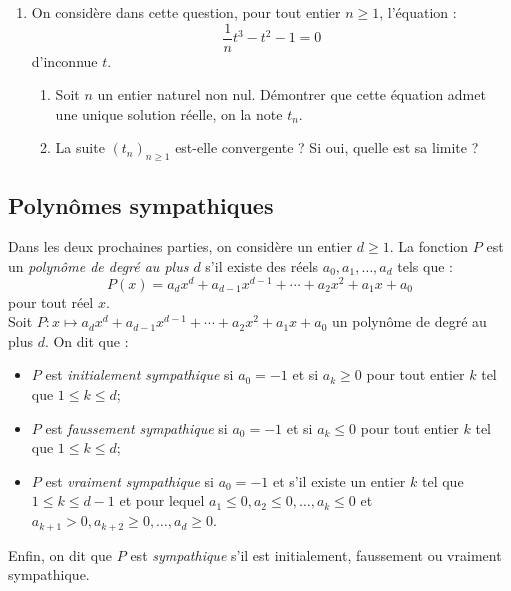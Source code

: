 \documentclass[landscape,twocolumn,leqno,a4paper,10pt]{report} %
\renewcommand{\geq}{\geqslant}
\begin{document}
\begin{enumerate}
\begin{enumerate}
	\end{enumerate}
	\item On considère dans cette question, pour tout entier $n \geq 1$, l'équation :
	$$\frac{1}{n} t^{3}-t^{2}-1=0$$
	d'inconnue $t$.
	\begin{enumerate}
		\item Soit $n$ un entier naturel non nul. Démontrer que cette équation admet une unique solution réelle, on la note $t_{n}$.
		\item La suite $\left(t_{n}\right)_{n \geq 1}$ est-elle convergente ? Si oui, quelle est sa limite ?
	\end{enumerate}
\end{enumerate}


\subsection{Polynômes sympathiques}


Dans les deux prochaines parties, on considère un entier $d \geq 1$. La fonction $P$ est un \textit{polynôme de degré au plus $d$} s'il existe des réels $a_{0}, a_{1}, \ldots, a_{d}$ tels que :
$$P(x)=a_{d} x^{d}+a_{d-1} x^{d-1}+\cdots+a_{2} x^{2}+a_{1} x+a_{0}$$
pour tout réel $x$.\\
Soit $P: x \mapsto a_{d} x^{d}+a_{d-1} x^{d-1}+\cdots+a_{2} x^{2}+a_{1} x+a_{0}$ un polynôme de degré au plus $d$. On dit que :

\begin{itemize}
	\item[$\triangleright$] $P$ est \textit{initialement sympathique} si $a_{0}=-1$ et si $a_{k} \geq 0$ pour tout entier $k$ tel que $1 \leqslant k \leqslant d$;
	\item[$\triangleright$] $P$ est \textit{faussement sympathique} si $a_{0}=-1$ et si $a_{k} \leqslant 0$ pour tout entier $k$ tel que $1 \leqslant k \leqslant d$;
	\item[$\triangleright$] $P$ est \textit{vraiment sympathique} si $a_{0}=-1$ et s'il existe un entier $k$ tel que $1 \leqslant k \leqslant d-1$ et pour lequel $a_{1} \leqslant 0, a_{2} \leqslant 0, \ldots, a_{k} \leqslant 0$ et $a_{k+1}>0, a_{k+2} \geq 0, \ldots, a_{d} \geq 0$.
\end{itemize}
Enfin, on dit que $P$ est \textit{sympathique} s'il est initialement, faussement ou vraiment sympathique.
\end{document}
